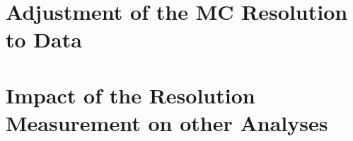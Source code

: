 \section{Adjustment of the MC Resolution to Data}
\label{sec:jer_adjustment}

\section{Impact of the Resolution Measurement on other Analyses}
\label{sec:jer_impact}













